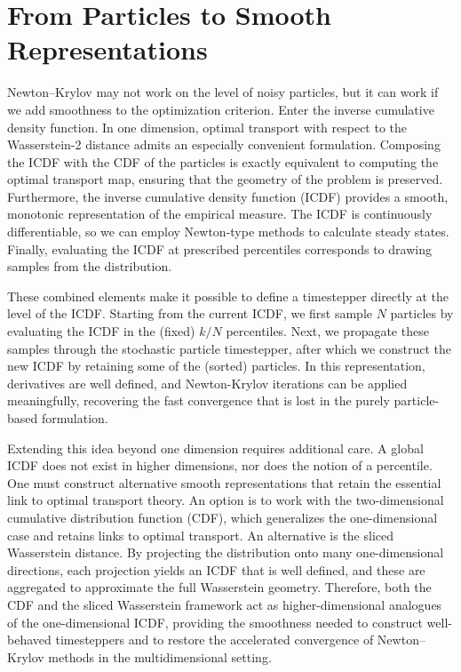 \documentclass{article}
\begin{document}
\section{From Particles to Smooth Representations} \label{sec:particles_to_smooth}
Newton–Krylov may not work on the level of noisy particles, but it can work if we add smoothness to the optimization criterion. Enter the inverse cumulative density function. In one dimension, optimal transport with respect to the Wasserstein-2 distance admits an especially convenient formulation. Composing the ICDF with the CDF of the particles is exactly equivalent to computing the optimal transport map, ensuring that the geometry of the problem is preserved. Furthermore, the inverse cumulative density function (ICDF) provides a smooth, monotonic representation of the empirical measure. The ICDF is continuously differentiable, so we can employ Newton-type methods to calculate steady states. Finally, evaluating the ICDF at prescribed percentiles corresponds to drawing samples from the distribution.

These combined elements make it possible to define a timestepper directly at the level of the ICDF. Starting from the current ICDF, we first sample $N$ particles by evaluating the ICDF in the (fixed) $k/N$ percentiles. Next, we propagate these samples through the stochastic particle timestepper, after which we construct the new ICDF by retaining some of the (sorted) particles. In this representation, derivatives are well defined, and Newton-Krylov iterations can be applied meaningfully, recovering the fast convergence that is lost in the purely particle-based formulation.

Extending this idea beyond one dimension requires additional care. A global ICDF does not exist in higher dimensions, nor does the notion of a percentile. One must construct alternative smooth representations that retain the essential link to optimal transport theory. An option is to work with the two-dimensional cumulative distribution function (CDF), which generalizes the one-dimensional case and retains links to optimal transport. An alternative is the sliced Wasserstein distance. By projecting the distribution onto many one-dimensional directions, each projection yields an ICDF that is well defined, and these are aggregated to approximate the full Wasserstein geometry. Therefore, both the CDF and the sliced Wasserstein framework act as higher-dimensional analogues of the one-dimensional ICDF, providing the smoothness needed to construct well-behaved timesteppers and to restore the accelerated convergence of Newton–Krylov methods in the multidimensional setting.
\end{document}
